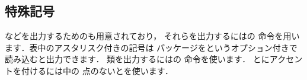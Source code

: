 \subsection{特殊記号}
%
などを出力するためのも用意されており，
それらを出力するにはの
命令を用います．表中のアスタリスク\qu{\str*}付きの記号は
パッケージをというオプション付きで
読み込むと出力できます．%
類を出力するにはの
命令を使います．
とにアクセントを付けるには中の
点のないとを使います．
%

